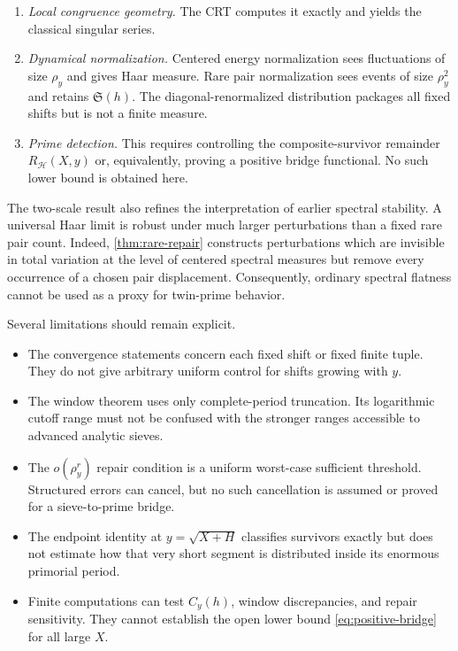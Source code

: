\documentclass[11pt]{article}
\theoremstyle{definition}
\theoremstyle{remark}
\newcommand{\cH}{\mathcal H}
\begin{document}
\begin{enumerate}[label=\textbf{L\arabic*.},leftmargin=3.2em]
    \item \emph{Local congruence geometry.}  The CRT computes it exactly and yields the classical singular series.

    \item \emph{Dynamical normalization.}  Centered energy normalization sees fluctuations of size $\rho_y$ and gives Haar measure.  Rare pair normalization sees events of size $\rho_y^2$ and retains $\mathfrak S(h)$.  The diagonal-renormalized distribution packages all fixed shifts but is not a finite measure.

    \item \emph{Prime detection.}  This requires controlling the composite-survivor remainder $R_{\cH}(X,y)$ or, equivalently, proving a positive bridge functional.  No such lower bound is obtained here.
\end{enumerate}

The two-scale result also refines the interpretation of earlier spectral stability.  A universal Haar limit is robust under much larger perturbations than a fixed rare pair count.  Indeed, \cref{thm:rare-repair} constructs perturbations which are invisible in total variation at the level of centered spectral measures but remove every occurrence of a chosen pair displacement.  Consequently, ordinary spectral flatness cannot be used as a proxy for twin-prime behavior.

Several limitations should remain explicit.

\begin{itemize}[leftmargin=1.8em]
    \item The convergence statements concern each fixed shift or fixed finite tuple.  They do not give arbitrary uniform control for shifts growing with $y$.

    \item The window theorem uses only complete-period truncation.  Its logarithmic cutoff range must not be confused with the stronger ranges accessible to advanced analytic sieves.

    \item The $o(\rho_y^r)$ repair condition is a uniform worst-case sufficient threshold.  Structured errors can cancel, but no such cancellation is assumed or proved for a sieve-to-prime bridge.

    \item The endpoint identity at $y=\sqrt{X+H}$ classifies survivors exactly but does not estimate how that very short segment is distributed inside its enormous primorial period.

    \item Finite computations can test $C_y(h)$, window discrepancies, and repair sensitivity.  They cannot establish the open lower bound \eqref{eq:positive-bridge} for all large $X$.
\end{itemize}
\end{document}
